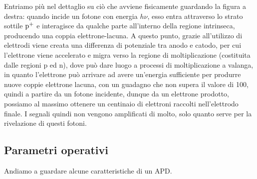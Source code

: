 Entriamo più nel dettaglio su ciò che avviene fisicamente guardando la figura a destra: quando incide un fotone con energia $h \nu$, esso entra attraverso lo strato sottile $\rm p^{+}$ e interagisce da qualche parte all'interno della regione intrinseca, producendo una coppia elettrone-lacuna. A questo punto, grazie all'utilizzo di elettrodi viene creata una differenza di potenziale tra anodo e catodo, per cui l'elettrone viene accelerato e migra verso la regione di moltiplicazione (costituita dalle regioni p ed n), dove può dare luogo a processi di moltiplicazione a valanga, in quanto l'elettrone può arrivare ad avere un'energia sufficiente per produrre nuove coppie elettrone lacuna, con un guadagno che non supera il valore di 100, quindi a partire da un fotone incidente, dunque da un elettrone prodotto, possiamo al massimo ottenere un centinaio di elettroni raccolti nell'elettrodo finale. I segnali quindi non vengono amplificati di molto, solo quanto serve per la rivelazione di questi fotoni.

\subsection{Parametri operativi}
Andiamo a guardare alcune caratteristiche di un APD.

